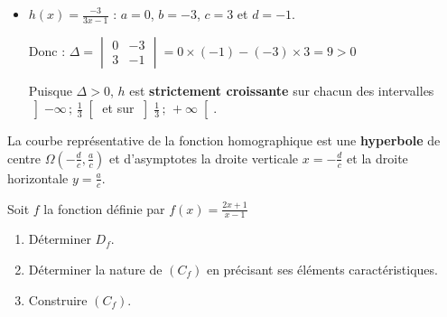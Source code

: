 \documentclass[10pt, a4paper]{article}
\begin{document}
\begin{Solution}[APPLICATION][25]
\begin{itemize}[leftmargin=*,itemsep=0.5pt]
    \item $h(x) = \frac{-3}{3x-1}$ : \quad $a = 0$, $b = -3$, $c = 3$ et $d = -1$.

    Donc : \quad $\Delta = \begin{vmatrix} 0 & -3 \\ 3 & -1 \end{vmatrix} = 0 \times (-1) - (-3) \times 3 = 9 > 0$

    Puisque $\Delta > 0$, $h$ est \textbf{strictement croissante} sur chacun des intervalles $\left]-\infty\,;\,\frac{1}{3}\right[$ et sur $\left]\frac{1}{3}\,;\,+\infty\right[$.

    \begin{center}
    \end{center}
\end{itemize}
\end{Solution}


\begin{Propriete}[Courbe]
La courbe représentative de la fonction homographique est une \textbf{hyperbole} de centre $\Omega\left(-\frac{d}{c}, \frac{a}{c}\right)$ et d'asymptotes la droite verticale $x=-\frac{d}{c}$ et la droite horizontale $y=\frac{a}{c}$.
\end{Propriete}

\begin{Application}[][35 min]
Soit $f$ la fonction définie par $f(x) = \frac{2x+1}{x-1}$
\begin{enumerate}[leftmargin=*,itemsep=0.5pt]
    \item Déterminer $D_f$.
    \item Déterminer la nature de $(C_f)$ en précisant ses éléments caractéristiques.
    \item Construire $(C_f)$.
\end{enumerate}
\end{Application}
\end{document}
